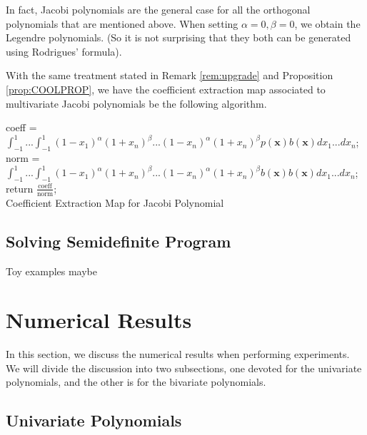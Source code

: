 \documentclass[12pt]{amsart}
\numberwithin{equation}{section}
\theoremstyle{definition}
\numberwithin{thm}{section}
\begin{document}
In fact, Jacobi polynomials are the general case for all the orthogonal polynomials that are mentioned above. 
When setting $\alpha = 0, \beta = 0$, we obtain the Legendre polynomials. (So it is not surprising that they both can be generated using Rodrigues' formula).

With the same treatment stated in Remark \ref{rem:upgrade} and Proposition \ref{prop:COOLPROP},
we have the {coefficient extraction map} associated to multivariate Jacobi polynomials be the following algorithm.

\begin{algorithm}[H]
     \SetAlgoLined
     coeff = $\int_{-1}^1 ... \int_{-1}^1 (1-x_1)^{\alpha} (1+x_n)^{\beta} ... (1-x_n)^{\alpha} (1+x_n)^{\beta} p(\mathbf{x})b(\mathbf{x}) dx_1 ... dx_n$;\\
     norm = $\int_{-1}^1 ... \int_{-1}^1 (1-x_1)^{\alpha} (1+x_n)^{\beta} ... (1-x_n)^{\alpha} (1+x_n)^{\beta} b(\mathbf{x}) b(\mathbf{x}) dx_1 ... dx_n$;\\
     return $\frac{\text{coeff}}{\text{norm}}$;\\
     \caption{Coefficient Extraction Map for Jacobi Polynomial}
\end{algorithm}


\subsection{Solving Semidefinite Program}
\label{Sec:Solving Semidefinite Program}




Toy examples maybe

\newpage
\section{Numerical Results}
\label{Sec: Num Results}

In this section, we discuss the numerical results when performing experiments. 
We will divide the discussion into two subsections, one devoted for the univariate polynomials, 
and the other is for the bivariate polynomials. 

\subsection{Univariate Polynomials}
\end{document}
